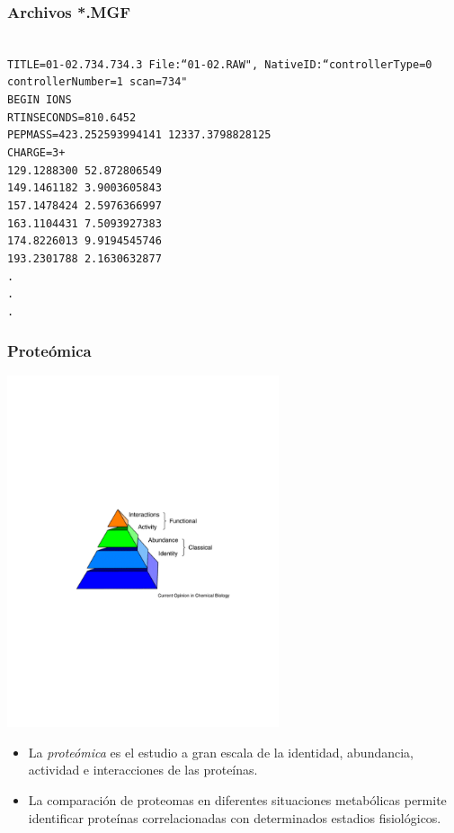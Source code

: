\documentclass[10pt]{beamer}
\begin{document}
\begin{frame}
\frametitle{Archivos *.MGF}
\texttt{
\\
TITLE=01-02.734.734.3 File:``01-02.RAW", NativeID:``controllerType=0 controllerNumber=1 scan=734"\\
BEGIN IONS\\
RTINSECONDS=810.6452\\
PEPMASS=423.252593994141 12337.3798828125\\
CHARGE=3+\\
129.1288300 52.872806549 \\
149.1461182 3.9003605843 \\
157.1478424 2.5976366997 \\
163.1104431 7.5093927383 \\
174.8226013 9.9194545746 \\
193.2301788 2.1630632877 \\
.\\
.\\
.\\
}
\end{frame}
\begin{frame}
\frametitle{Proteómica}
\begin{center}
\includegraphics[width=8cm]{imagenes/Proteomics}
\end{center}
\begin{itemize}
\item La \emph{proteómica} es el estudio a gran escala de la identidad, abundancia, actividad e interacciones de las proteínas.
\pause
\item La comparación de proteomas en diferentes situaciones metabólicas permite identificar proteínas correlacionadas con determinados estadios fisiológicos.
\end{itemize}
\end{frame}
\end{document}
